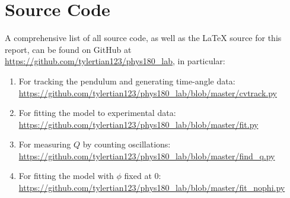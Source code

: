 \documentclass[aps,twocolumn,secnumarabic,nobalancelastpage,amsmath,amssymb,nofootinbib]{revtex4}
\begin{document}

\appendix
\section{Source Code}

A comprehensive list of all source code, as well as the \LaTeX{} source for this report, can be found on GitHub at
\url{https://github.com/tylertian123/phys180_lab}, in particular:
\label{appendix:code}
\begin{enumerate}
    \item For tracking the pendulum and generating time-angle data: \url{https://github.com/tylertian123/phys180_lab/blob/master/cvtrack.py}
    \item For fitting the model to experimental data: \url{https://github.com/tylertian123/phys180_lab/blob/master/fit.py}
    \item For measuring \(Q\) by counting oscillations: \url{https://github.com/tylertian123/phys180_lab/blob/master/find_q.py}
    \item For fitting the model with \(\phi\) fixed at 0: \url{https://github.com/tylertian123/phys180_lab/blob/master/fit_nophi.py}
\end{enumerate}
\end{document}
